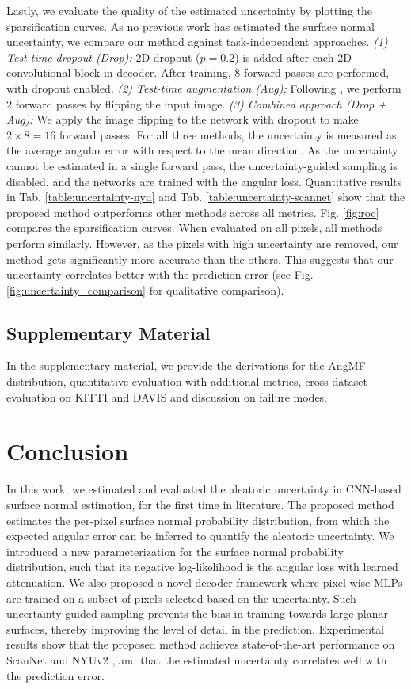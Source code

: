 \documentclass[10pt,twocolumn,letterpaper]{article}
\begin{document}
Lastly, we evaluate the quality of the estimated uncertainty by plotting the sparsification curves. As no previous work has estimated the surface normal uncertainty, we compare our method against task-independent approaches. \textit{(1) Test-time dropout (Drop):} 2D dropout ($p=0.2$) is added after each 2D convolutional block in decoder. After training, 8 forward passes are performed, with dropout enabled. \textit{(2) Test-time augmentation (Aug):} Following \cite{on_the_uncertainty}, we perform 2 forward passes by flipping the input image. \textit{(3) Combined approach (Drop + Aug):} We apply the image flipping to the network with dropout to make $2 \! \times \! 8 \! = \! 16$ forward passes. For all three methods, the uncertainty is measured as the average angular error with respect to the mean direction. As the uncertainty cannot be estimated in a single forward pass, the uncertainty-guided sampling is disabled, and the networks are trained with the angular loss. Quantitative results in Tab. \ref{table:uncertainty-nyu} and Tab. \ref{table:uncertainty-scannet} show that the proposed method outperforms other methods across all metrics. Fig. \ref{fig:roc} compares the sparsification curves. When evaluated on all pixels, all methods perform similarly. However, as the pixels with high uncertainty are removed, our method gets significantly more accurate than the others. This suggests that our uncertainty correlates better with the prediction error (see Fig. \ref{fig:uncertainty_comparison} for qualitative comparison).  

\subsection{Supplementary Material}

In the supplementary material, we provide the derivations for the AngMF distribution, quantitative evaluation with additional metrics, cross-dataset evaluation on KITTI \cite{KITTI} and DAVIS \cite{DAVIS} and discussion on failure modes.

\section{Conclusion}

In this work, we estimated and evaluated the aleatoric uncertainty in CNN-based surface normal estimation, for the first time in literature. The proposed method estimates the per-pixel surface normal probability distribution, from which the expected angular error can be inferred to quantify the aleatoric uncertainty. We introduced a new parameterization for the surface normal probability distribution, such that its negative log-likelihood is the angular loss with learned attenuation. We also proposed a novel decoder framework where pixel-wise MLPs are trained on a subset of pixels selected based on the uncertainty. Such uncertainty-guided sampling prevents the bias in training towards large planar surfaces, thereby improving the level of detail in the prediction. Experimental results show that the proposed method achieves state-of-the-art performance on ScanNet \cite{ScanNet} and NYUv2 \cite{NYUv2}, and that the estimated uncertainty correlates well with the prediction error.
\end{document}
